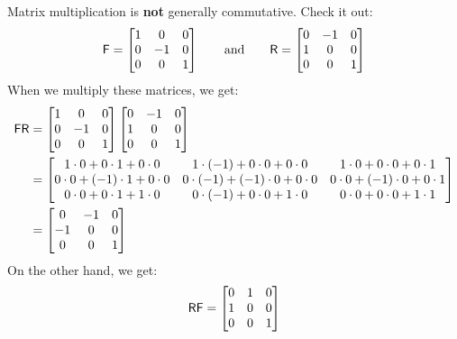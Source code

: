 \begin{war}
Matrix multiplication is \textbf{not} generally commutative. Check it out:
\[
\mathsf{F} =
\begin{bmatrix}
1 & 0 & 0\\
0 & -1 & 0\\
0 & 0 & 1
\end{bmatrix}
\qquad\text{and}\qquad
\mathsf{R} = 
\begin{bmatrix}
0 & -1 & 0\\
1 & 0 & 0\\
0 & 0 & 1
\end{bmatrix}
\]
When we multiply these matrices, we get:
\begin{align*}
\mathsf{F}\mathsf{R} &= \begin{bmatrix}
1 & 0 & 0\\
0 & -1 & 0\\
0 & 0 & 1\\
\end{bmatrix}
\begin{bmatrix}
0 & -1 & 0\\
1 & 0 & 0\\
0 & 0 & 1\\
\end{bmatrix} \\
&=
\begin{bmatrix}
1\cdot 0 +  0\cdot 1 + 0\cdot 0 & 1\cdot (-1) +  0\cdot 0 + 0\cdot 0 & 1\cdot 0 +  0\cdot 0 + 0\cdot 1\\
0\cdot 0 + (-1)\cdot 1 + 0\cdot 0 & 0\cdot (-1) + (-1)\cdot 0 + 0\cdot 0 & 0\cdot 0 + (-1)\cdot 0 + 0\cdot 1\\
0\cdot 0 +  0\cdot 1 + 1\cdot 0 & 0\cdot (-1) +  0\cdot 0 + 1\cdot 0 & 0\cdot 0 +  0\cdot 0 + 1\cdot 1\\
\end{bmatrix} \\
&=
\begin{bmatrix}
0 & -1 & 0\\
-1 & 0 & 0\\
0 & 0 & 1\\
\end{bmatrix}
\end{align*}
On the other hand, we get:
\[
\mathsf{R}\mathsf{F} = \begin{bmatrix}
0 & 1 & 0\\
1 & 0 & 0\\
0 & 0 & 1
\end{bmatrix}
\]
\end{war}

